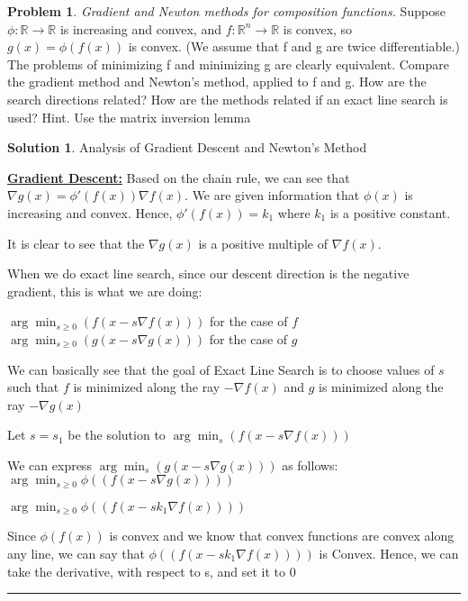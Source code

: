 \documentclass{article}
\theoremstyle{definition}
\newtheorem{problem}{Problem}
\def\fline{\rule{0.75\linewidth}{0.5pt}}
\newcommand{\finishline}{\begin{center}\fline\end{center}}
\newtheorem*{solution*}{Solution}
\newenvironment{solution}{\begin{solution*}}{{\finishline} \end{solution*}}
\begin{document}
\begin{problem} \textit{Gradient and Newton methods for composition functions.} Suppose $\phi: \mathbb{R} \rightarrow \mathbb{R}$ is increasing and convex, and $f: \mathbb{R}^n \rightarrow \mathbb{R}$ is convex, so $g(x) = \phi(f(x))$ is convex. (We assume that f and g are twice differentiable.) The problems of minimizing f and minimizing g are clearly equivalent. \newline 
Compare the gradient method and Newton’s method, applied to f and g. How are the
search directions related? How are the methods related if an exact line search is used?
Hint. Use the matrix inversion lemma

\begin{solution} Analysis of Gradient Descent and Newton's Method

\textbf{\underline{Gradient Descent:}} \newline 
    Based on the chain rule, we can see that $\nabla g(x) = \phi'(f(x)) \nabla f(x)$. We are given information that $\phi(x)$ is increasing and convex. Hence, $\phi'(f(x)) = k_1$ where $k_1$ is a positive constant. 
    
    It is clear to see that the $\nabla g(x)$ is a positive multiple of $\nabla f(x)$.  
    
    When we do exact line search, since our descent direction is the negative gradient, this is what we are doing:

    $\arg \min_{s \geq 0} (f(x - s\nabla f(x)))$ for the case of $f$ \newline 
    $\arg \min_{s \geq 0} (g(x - s\nabla g(x)))$ for the case of $g$ \newline 

    We can basically see that the goal of Exact Line Search is to choose values of $s$ such that $f$ is minimized along the ray $-\nabla f(x)$ and $g$ is minimized along the ray $-\nabla g(x)$

    Let $s = s_1$ be the solution to $\arg \min_{s} (f(x - s\nabla f(x)))$


    We can express $\arg \min_{s} (g(x - s\nabla g(x)))$ as follows: \newline 
    $\arg \min_{s \geq 0} \phi((f(x - s\nabla g(x))))$ 

    $\arg \min_{s \geq 0} \phi((f(x - sk_1 \nabla f(x))))$

    Since $\phi(f(x))$ is convex and we know that convex functions are convex along any line, we can say that $\phi((f(x - sk_1 \nabla f(x))))$ is Convex. Hence, we can take the derivative, with respect to s, and set it to 0


\end{solution}
\end{problem}
\end{document}
